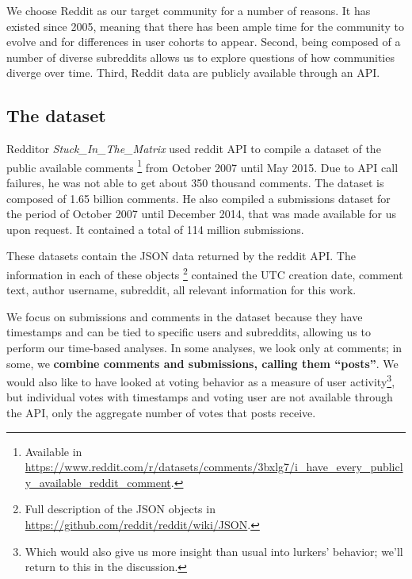 We choose Reddit as our target community for a number of reasons.  It has existed since 2005, meaning that there has been ample time for the community to evolve and for differences in user cohorts to appear.  Second, being composed of a number of diverse subreddits allows us to explore questions of how communities diverge over time.  Third, Reddit data are publicly available through an API.

\subsection{The dataset}

Redditor \textit{Stuck\_In\_The\_Matrix} used reddit API to compile a dataset of the public available comments \footnote{Available in \url{https://www.reddit.com/r/datasets/comments/3bxlg7/i_have_every_publicly_available_reddit_comment}.} from October 2007 until May 2015. Due to API call failures, he was not able to get about 350 thousand comments. The dataset is composed of 1.65 billion comments. He also compiled a submissions dataset for the period of October 2007 until December 2014, that was made available for us upon request. It contained a total of 114 million submissions.

These datasets contain the JSON data returned by the reddit API. The information in each of these objects \footnote{Full description of the JSON objects in \url{https://github.com/reddit/reddit/wiki/JSON}.} contained the UTC creation date, comment text, author username, subreddit, all relevant information for this work.



We focus on submissions and comments in the dataset because they have timestamps and can be tied to specific users and subreddits, allowing us to perform our time-based analyses.   In some analyses, we look only at comments; in some, we \textbf{combine comments and submissions, calling them ``posts''}.  We would also like to have looked at voting behavior as a measure of user activity\footnote{Which would also give us more insight than usual into lurkers' behavior; we'll return to this in the discussion.}, but individual votes with timestamps and voting user are not available through the API, only the aggregate number of votes that posts receive.

